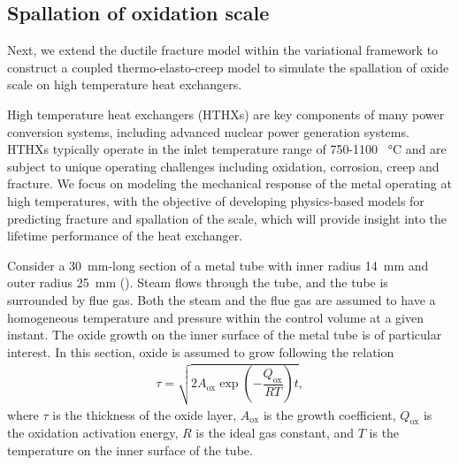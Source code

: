 \subsection{Spallation of oxidation scale}
\label{section: Chapter5/examples/spallation}

Next, we extend the ductile fracture model within the variational framework to construct a coupled thermo-elasto-creep model to simulate the spallation of oxide scale on high temperature heat exchangers.

High temperature heat exchangers (HTHXs) are key components of many power conversion systems, including advanced nuclear power generation systems. HTHXs typically operate in the inlet temperature range of 750-1100 \SI{}{\celsius} and are subject to unique operating challenges including oxidation, corrosion, creep and fracture.  We focus on modeling the mechanical response of the metal operating at high temperatures, with the objective of developing physics-based models for predicting fracture and spallation of the scale, which will provide insight into the lifetime performance of the heat exchanger.



Consider a \SI{30}{\milli\meter}-long section of a metal tube with inner radius \SI{14}{\milli\meter} and outer radius \SI{25}{\milli\meter} (). Steam flows through the tube, and the tube is surrounded by flue gas. Both the steam and the flue gas are assumed to have a homogeneous temperature and pressure within the control volume at a given instant. The oxide growth on the inner surface of the metal tube is of particular interest. In this section, oxide is assumed to grow following the relation
\begin{align}
  \tau = \sqrt{2A_\text{ox}\exp\left( -\dfrac{Q_\text{ox}}{RT} \right) t},
\end{align}
where $\tau$ is the thickness of the oxide layer, $A_\text{ox}$ is the growth coefficient, $Q_\text{ox}$ is the oxidation activation energy, $R$ is the ideal gas constant, and $T$ is the temperature on the inner surface of the tube.

